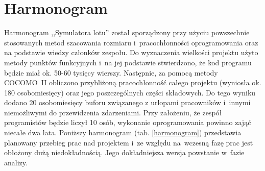 \documentclass{mwrep}
\begin{document}
\chapter{Harmonogram}
Harmonogram ,,Symulatora lotu'' został sporządzony przy użyciu powszechnie stosowanych metod szacowania rozmiaru i~pracochłonności oprogramowania oraz na podstawie wiedzy członków zespołu. Do wyznaczenia wielkości projektu użyto metody punktów funkcyjnych i~na jej podstawie stwierdzono, że kod programu będzie miał ok. 50-60 tysięcy wierszy. Następnie, za pomocą metody COCOMO~II obliczono przybliżoną pracochłonność całego projektu (wyniosła ok. 180 osobomiesięcy) oraz jego poszczególnych części składowych. Do tego wyniku dodano 20 osobomiesięcy buforu związanego z urlopami pracowników i~innymi niemożliwymi do przewidzenia zdarzeniami. Przy założeniu, że zespół programistów będzie liczył 10 osób, wykonanie oprogramowania powinno zająć niecałe dwa lata.
Poniższy harmonogram (tab. \ref{harmonogram}) przedstawia planowany przebieg prac nad projektem i~ze względu na~wczesną fazę prac jest obłożony dużą niedokładnością. Jego dokładniejsza wersja powstanie w~fazie analizy.
\end{document}
